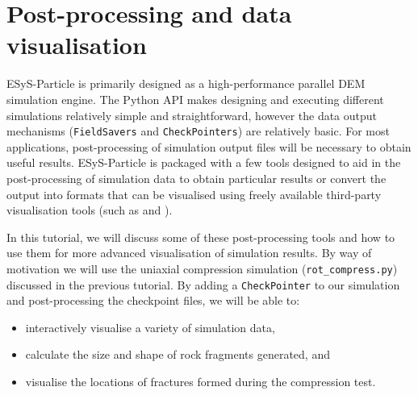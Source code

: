 
\newpage
\section{Post-processing and data visualisation}

ESyS-Particle is primarily designed as a high-performance parallel DEM simulation engine. The Python API makes designing and executing different simulations relatively simple and straightforward, however the data output mechanisms (\texttt{FieldSavers} and \texttt{CheckPointers}) are relatively basic. For most applications, post-processing of simulation output files will be necessary to obtain useful results. ESyS-Particle is packaged with a few tools designed to aid in the post-processing of simulation data to obtain particular results or convert the output into formats that can be visualised using freely available third-party visualisation tools (such as  and ). 

In this tutorial, we will discuss some of these post-processing tools and how to use them for more advanced visualisation of simulation results. By way of motivation we will use the uniaxial compression simulation (\texttt{rot\_compress.py}) discussed in the previous tutorial. By adding a \texttt{CheckPointer} to our simulation and post-processing the checkpoint files, we will be able to:
\begin{itemize}
\item interactively visualise a variety of simulation data, 
\item calculate the size and shape of rock fragments generated, and 
\item visualise the locations of fractures formed during the compression test.
\end{itemize}

